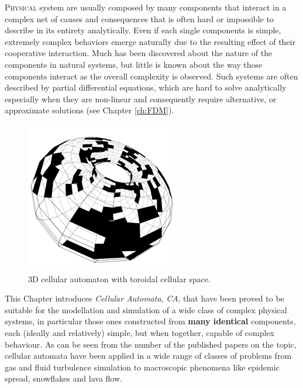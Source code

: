 \lettrine[lines=4]{P}{hysical} system are usually composed by many components that interact in a complex net of causes and consequences that is often hard or impossible to describe in its entirety analytically.
Even if each single components is simple, extremely complex behaviors emerge naturally due to the resulting effect of their cooperative interaction. Much has been discovered about the nature of the components in natural systems, but little is known about the way those components interact as the overall complexity is observed.
Such systems are often described by partial differential equations, which are hard to solve analytically especially when they are non-linear and consequently require alternative, or approximate solutions (see Chapter \ref{ch:FDM}).
\begin{figure}
\includegraphics[scale=0.8]{./images/CA_FDM/torus-2}
\caption{3D cellular automaton with toroidal cellular space.}
\label{torus}
\end{figure}
This Chapter introduces \textit{Cellular Automata}, \textit{CA}, that  have been proved to be suitable for the modellation and simulation of a wide class of complex physical systems, in particular those ones constructed from \textbf{many identical} components, each (ideally and relatively) simple, but when together, capable of complex behaviour\cite{Toffoli1984,toffoli1987}.
As can be seen from the number of the published papers on the topic, cellular automata have been applied in a wide range of classes of problems from gas\cite{Frisch1986} and fluid turbulence\cite{Succi1991} simulation to macroscopic phenomena\cite{Gregorio1999} like epidemic spread\cite{Sirakoulis2000}, snowflakes and lava flow\cite{dspataro_sciara:2017,Crisci2004,Spataro2010}.
